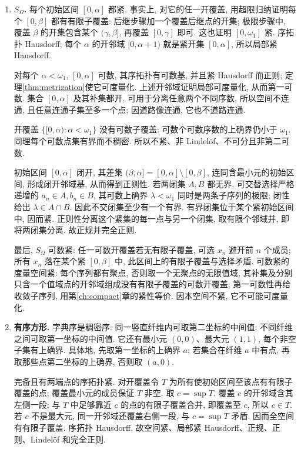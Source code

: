 \begin{solution}
\begin{enumerate}
\item \textbf{$S_\Omega$.}
每个初始区间 $[0,\alpha]$ 都紧. 事实上, 对它的任一开覆盖, 用超限归纳证明每个 $[0,\beta]$ 都有有限子覆盖: 后继步骤加一个覆盖后继点的开集; 极限步骤中, 覆盖 $\beta$ 的开集包含某个 $(\gamma,\beta]$, 再覆盖 $[0,\gamma]$ 即可. 这也证明 $[0,\omega_1]$ 紧. 序拓扑 Hausdorff; 每个 $\alpha$ 的开邻域 $[0,\alpha+1)$ 就是紧开集 $[0,\alpha]$, 所以局部紧 Hausdorff.

对每个 $\alpha<\omega_1$, $[0,\alpha]$ 可数, 其序拓扑有可数基, 并且紧 Hausdorff 而正则; 定理\ref{thm:metrization}使它可度量化. 上述开邻域证明局部可度量化, 从而第一可数. 集合 $[0,\alpha]$ 及其补集都开, 可用于分离任意两个不同序数, 所以空间不连通, 且任意连通子集至多一个点; 因道路像连通, 它也不道路连通.

开覆盖 $\{[0,\alpha):\alpha<\omega_1\}$ 没有可数子覆盖: 可数个可数序数的上确界仍小于 $\omega_1$. 同理每个可数点集有界而不稠密. 所以不紧、非 Lindel\"of、不可分且非第二可数.

初始区间 $[0,\alpha]$ 闭开, 其差集 $(\beta,\alpha]=[0,\alpha]\setminus[0,\beta]$, 连同含最小元的初始区间, 形成闭开邻域基, 从而得到正则性. 若两闭集 $A,B$ 都无界, 可交替选择严格递增的 $a_n\in A,b_n\in B$, 其可数上确界 $\lambda<\omega_1$ 同时是两条子序列的极限; 闭性给出 $\lambda\in A\cap B$. 因此不交闭集至少有一个有界. 有界闭集位于某个紧初始区间中, 因而紧. 正则性分离这个紧集的每一点与另一个闭集, 取有限个邻域并, 即将两闭集分离. 故正规并完全正则.

最后, $S_\Omega$ 可数紧: 任一可数开覆盖若无有限子覆盖, 可选 $x_n$ 避开前 $n$ 个成员; 所有 $x_n$ 落在某个紧 $[0,\beta]$ 中, 此区间上的有限子覆盖与选择矛盾. 可数紧的度量空间紧: 每个序列都有聚点, 否则取一个无聚点的无限值域, 其补集及分别只含一个值域点的开邻域组成没有有限子覆盖的可数开覆盖; 第一可数性再给收敛子序列, 用第\ref{ch:compact}章的紧性等价. 因本空间不紧, 它不可能可度量化.

\item \textbf{有序方形.}
字典序是稠密序: 同一竖直纤维内可取第二坐标的中间值; 不同纤维之间可取第一坐标的中间值. 它还有最小元 $(0,0)$、最大元 $(1,1)$, 每个非空子集有上确界. 具体地, 先取第一坐标的上确界 $a$; 若集合在纤维 $a$ 中有点, 再取那些点第二坐标的上确界, 否则取 $(a,0)$.

完备且有两端点的序拓扑紧. 对开覆盖令 $T$ 为所有使初始区间至该点有有限子覆盖的点; 覆盖最小元的成员保证 $T$ 非空. 取 $c=\sup T$. 覆盖 $c$ 的开邻域含其左侧一段; 与 $T$ 中足够靠近 $c$ 的点的有限子覆盖合并, 即覆盖至 $c$, 所以 $c\in T$. 若 $c$ 不是最大元, 同一开邻域还覆盖右侧一段, 与 $c=\sup T$ 矛盾. 因而全空间有有限子覆盖. 序拓扑 Hausdorff, 故空间紧、局部紧 Hausdorff、正规、正则、Lindel\"of 和完全正则.


\end{enumerate}
\end{solution}
